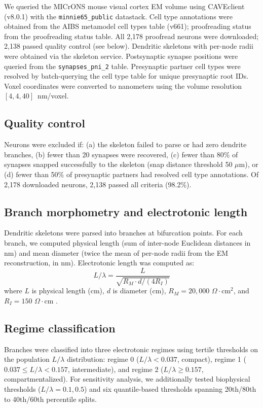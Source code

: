 \documentclass[11pt]{article}
\begin{document}
We queried the MICrONS mouse visual cortex EM volume \citep{microns2021, turner2022} using CAVEclient (v8.0.1) with the \texttt{minnie65\_public} datastack. Cell type annotations were obtained from the AIBS metamodel cell types table (v661); proofreading status from the proofreading status table. All 2,178 proofread neurons were downloaded; 2,138 passed quality control (see below). Dendritic skeletons with per-node radii were obtained via the skeleton service. Postsynaptic synapse positions were queried from the \texttt{synapses\_pni\_2} table. Presynaptic partner cell types were resolved by batch-querying the cell type table for unique presynaptic root IDs. Voxel coordinates were converted to nanometers using the volume resolution $[4, 4, 40]$~nm/voxel.

\subsection{Quality control}

Neurons were excluded if: (a) the skeleton failed to parse or had zero dendrite branches, (b) fewer than 20 synapses were recovered, (c) fewer than 80\% of synapses snapped successfully to the skeleton (snap distance threshold 50 $\mu$m), or (d) fewer than 50\% of presynaptic partners had resolved cell type annotations. Of 2,178 downloaded neurons, 2,138 passed all criteria (98.2\%).

\subsection{Branch morphometry and electrotonic length}

Dendritic skeletons were parsed into branches at bifurcation points. For each branch, we computed physical length (sum of inter-node Euclidean distances in nm) and mean diameter (twice the mean of per-node radii from the EM reconstruction, in nm). Electrotonic length was computed as:
\[
L/\lambda = \frac{L}{\sqrt{R_M \cdot d / (4 R_I)}}
\]
where $L$ is physical length (cm), $d$ is diameter (cm), $R_M = 20{,}000$ $\Omega \cdot \text{cm}^2$, and $R_I = 150$ $\Omega \cdot \text{cm}$ \citep{rall1967, koch1999}.

\subsection{Regime classification}

Branches were classified into three electrotonic regimes using tertile thresholds on the population $L/\lambda$ distribution: regime 0 ($L/\lambda < 0.037$, compact), regime 1 ($0.037 \leq L/\lambda < 0.157$, intermediate), and regime 2 ($L/\lambda \geq 0.157$, compartmentalized). For sensitivity analysis, we additionally tested biophysical thresholds ($L/\lambda = 0.1, 0.5$) and six quantile-based thresholds spanning 20th/80th to 40th/60th percentile splits.
\end{document}
